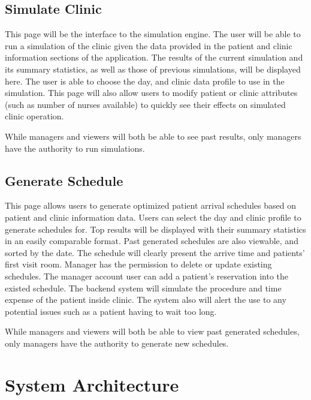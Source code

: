 \documentclass[12pt]{article}
\begin{document}
\subsection{Simulate Clinic}
This page will be the interface to the simulation engine. The user will be able to run a simulation of the clinic given the data provided in the patient and clinic information sections of the application. The results of the current simulation and its summary statistics, as well as those of previous simulations, will be displayed here. The user is able to choose the day, and clinic data profile to use in the simulation. This page will also allow users to modify patient or clinic attributes (such as number of nurses available) to quickly see their effects on simulated clinic operation. 

\noindent \newline
While managers and viewers will both be able to see past results, only managers have the authority to run simulations.

\subsection{Generate Schedule}
This page allows users to generate optimized patient arrival schedules based on patient and clinic information data. Users can select the day and clinic profile to generate schedules for. Top results will be displayed with their summary statistics in an easily comparable format. Past generated schedules are also viewable, and sorted by the date. The schedule will clearly present the arrive time and patients’ first visit room.  Manager has the permission to delete or update existing schedules. The manager account user can add a patient’s reservation into the existed schedule. The backend system will simulate the procedure and time expense of the patient inside clinic. The system also will alert the use to any potential issues such as a patient having to wait too long.

\noindent \newline
While managers and viewers will both be able to view past generated schedules, only managers have the authority to generate new schedules.




\section{System Architecture}
\end{document}

